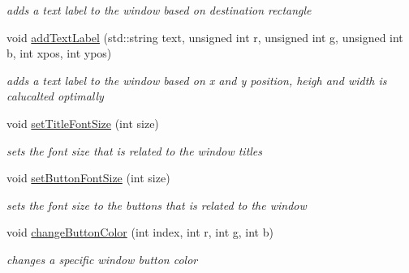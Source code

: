 \begin{DoxyCompactItemize}
\begin{DoxyCompactList}\small\item\em adds a text label to the window based on destination rectangle \end{DoxyCompactList}\item 
\hypertarget{class_text_based_window_a5cb46bf75bed08606abbb70a0b2f4264}{}\label{class_text_based_window_a5cb46bf75bed08606abbb70a0b2f4264} 
void \hyperlink{class_text_based_window_a5cb46bf75bed08606abbb70a0b2f4264}{add\+Text\+Label} (std\+::string text, unsigned int r, unsigned int g, unsigned int b, int xpos, int ypos)
\begin{DoxyCompactList}\small\item\em adds a text label to the window based on x and y position, heigh and width is calucalted optimally \end{DoxyCompactList}\item 
\hypertarget{class_text_based_window_a089c5c1f5090c9ad71421cdad3286723}{}\label{class_text_based_window_a089c5c1f5090c9ad71421cdad3286723} 
void \hyperlink{class_text_based_window_a089c5c1f5090c9ad71421cdad3286723}{set\+Title\+Font\+Size} (int size)
\begin{DoxyCompactList}\small\item\em sets the font size that is related to the window titles \end{DoxyCompactList}\item 
\hypertarget{class_text_based_window_a0c50e613daa00b4fe99ef1f290006038}{}\label{class_text_based_window_a0c50e613daa00b4fe99ef1f290006038} 
void \hyperlink{class_text_based_window_a0c50e613daa00b4fe99ef1f290006038}{set\+Button\+Font\+Size} (int size)
\begin{DoxyCompactList}\small\item\em sets the font size to the buttons that is related to the window \end{DoxyCompactList}\item 
\hypertarget{class_text_based_window_a9a63ff592b3a31e6cf5db15b0e10656c}{}\label{class_text_based_window_a9a63ff592b3a31e6cf5db15b0e10656c} 
void \hyperlink{class_text_based_window_a9a63ff592b3a31e6cf5db15b0e10656c}{change\+Button\+Color} (int index, int r, int g, int b)
\begin{DoxyCompactList}\small\item\em changes a specific window button color \end{DoxyCompactList}\item 
\hypertarget{class_text_based_window_a7354bc5aca3bd79777421ebe413c16b0}{}\label{class_text_based_window_a7354bc5aca3bd79777421ebe413c16b0} 

\end{DoxyCompactItemize}
